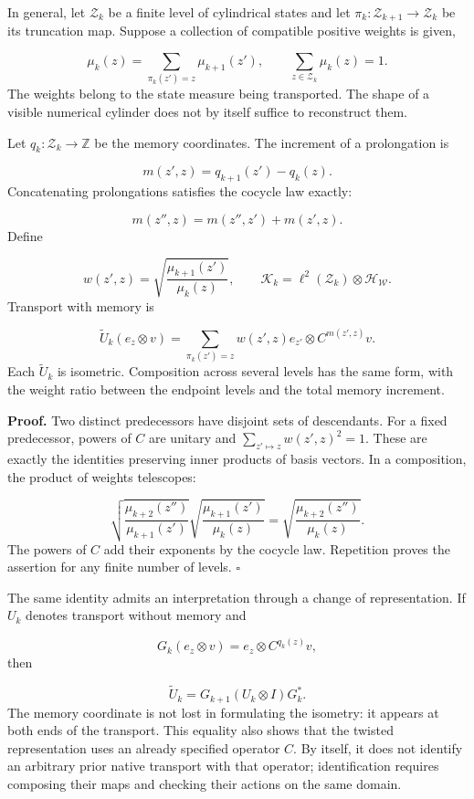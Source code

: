 In general, let \(\mathcal Z_k\) be a finite level of cylindrical states and let \(\pi_k:\mathcal Z_{k+1}\to\mathcal Z_k\) be its truncation map. Suppose a collection of compatible positive weights is given,

\[
\mu_k(z)=\sum_{\pi_k(z')=z}\mu_{k+1}(z'),
\qquad \sum_{z\in\mathcal Z_k}\mu_k(z)=1.
\]
The weights belong to the state measure being transported. The shape of a visible numerical cylinder does not by itself suffice to reconstruct them.

Let \(q_k:\mathcal Z_k\to\mathbb Z\) be the memory coordinates. The increment of a prolongation is

\[
m(z',z)=q_{k+1}(z')-q_k(z).
\]
Concatenating prolongations satisfies the cocycle law exactly:

\[
m(z'',z)=m(z'',z')+m(z',z).
\]
Define

\[
w(z',z)=
\sqrt{\frac{\mu_{k+1}(z')}{\mu_k(z)}},
\qquad
\mathcal K_k=\ell^2(\mathcal Z_k)\otimes\mathcal H_{\mathscr W}.
\]
Transport with memory is

\[
\widetilde U_k(e_z\otimes v)
=\sum_{\pi_k(z')=z}w(z',z)e_{z'}\otimes C^{m(z',z)}v.
\]
Each \(\widetilde U_k\) is isometric. Composition across several levels has the same form, with the weight ratio between the endpoint levels and the total memory increment.

\textbf{Proof.} Two distinct predecessors have disjoint sets of descendants. For a fixed predecessor, powers of \(C\) are unitary and \(\sum_{z'\mapsto z}w(z',z)^2=1\). These are exactly the identities preserving inner products of basis vectors. In a composition, the product of weights telescopes:

\[
\sqrt{\frac{\mu_{k+2}(z'')}{\mu_{k+1}(z')}}
\sqrt{\frac{\mu_{k+1}(z')}{\mu_k(z)}}
=\sqrt{\frac{\mu_{k+2}(z'')}{\mu_k(z)}}.
\]
The powers of \(C\) add their exponents by the cocycle law. Repetition proves the assertion for any finite number of levels. \hfill\(\square\)

The same identity admits an interpretation through a change of representation. If \(U_k\) denotes transport without memory and

\[
G_k(e_z\otimes v)=e_z\otimes C^{q_k(z)}v,
\]
then

\[
\widetilde U_k=G_{k+1}(U_k\otimes I)G_k^*.
\]
The memory coordinate is not lost in formulating the isometry: it appears at both ends of the transport. This equality also shows that the twisted representation uses an already specified operator \(C\). By itself, it does not identify an arbitrary prior native transport with that operator; identification requires composing their maps and checking their actions on the same domain.

